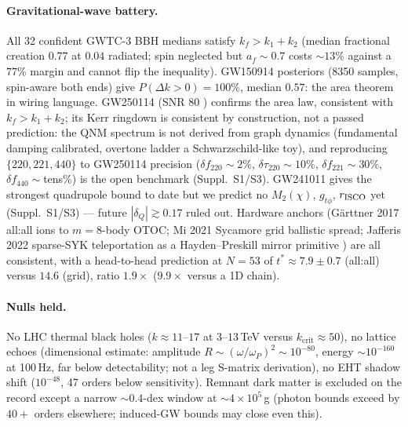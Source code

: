 \documentclass[11pt]{article}
\begin{document}
\paragraph{Gravitational-wave battery.}
All 32 confident GWTC-3 \cite{GWTC3,TestGR} BBH medians satisfy $k_f > k_1+k_2$ (median fractional
creation $0.77$ at $0.04$ radiated; spin neglected but $a_f \sim 0.7$ costs
$\sim 13\%$ against a $77\%$ margin and cannot flip the inequality).
GW150914 posteriors (8350 samples, spin-aware both ends) give
$P(\Delta k > 0) = 100\%$, median $0.57$: the area theorem in wiring language.
GW250114 (SNR 80 \cite{GW250114}) confirms the area law, consistent with $k_f>k_1+k_2$;
its Kerr ringdown is consistent by construction, not a passed prediction: the QNM spectrum is
not derived from graph dynamics (fundamental damping calibrated, overtone ladder a
Schwarzschild-like toy), and reproducing $\{220,221,440\}$ to GW250114 precision
($\delta f_{220}\sim2\%$, $\delta\tau_{220}\sim10\%$, $\delta f_{221}\sim30\%$,
$\delta f_{440}\sim$tens\%) is the open benchmark (Suppl.~S1/S3).
GW241011 gives the strongest quadrupole bound to date \cite{GW241011} but we predict no
$M_2(\chi)$, $g_{t\phi}$, $r_{\rm ISCO}$ yet (Suppl.~S1/S3) --- future $|\delta_Q|\gtrsim0.17$ ruled out.
Hardware anchors (G\"arttner 2017 \cite{Garttner2017} all:all ions to $m = 8$-body OTOC; Mi 2021
\cite{Mi2021} Sycamore grid ballistic spread; Jafferis 2022 \cite{Jafferis2022} sparse-SYK teleportation as a
Hayden--Preskill mirror primitive \cite{Hayden2007,Kitaev15}) are all consistent, with a head-to-head
prediction at $N = 53$ of $t^* \approx 7.9 \pm 0.7$ (all:all) versus $14.6$
(grid), ratio $1.9\times$ ($9.9\times$ versus a 1D chain).

\paragraph{Nulls held.}
No LHC thermal black holes \cite{LHCbh} ($k \approx 11$--$17$ at $3$--$13$\,TeV versus
$k_{\mathrm{crit}} \approx 50$), no lattice echoes (dimensional estimate: amplitude
$R\sim(\omega/\omega_P)^2\sim10^{-80}$, energy $\sim10^{-160}$ at 100\,Hz, far below
detectability; not a leg S-matrix derivation), no EHT shadow
shift ($10^{-48}$, 47 orders below sensitivity). Remnant dark matter is
excluded on the record except a narrow $\sim 0.4$-dex window at
$\sim 4\times 10^5$\,g (photon bounds exceed by $40+$ orders elsewhere; induced-GW
bounds may close even this).

\end{document}
